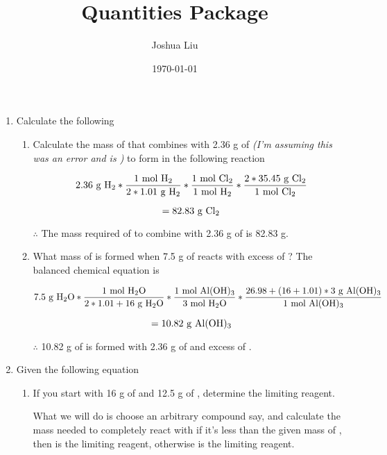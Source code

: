 \documentclass[10pt]{article}
\title{Quantities Package}
\author{Joshua Liu}
\date{\today}
\begin{document}
\maketitle

\begin{enumerate}
    \item Calculate the following
    \begin{enumerate}
        \item Calculate the mass of  that combines with 2.36 g of \sout{} \textit{(I'm assuming this was an error and is )} to form  in the following reaction
        

        \bigskip
        $$2.36\text{ g }\ce{H2}*\frac{1\text{ mol }\ce{H2}}{2*1.01\text{ g }\ce{H2}}*\frac{1\text{ mol }\ce{Cl2}}{1\text{ mol }\ce{H2}}*\frac{2*35.45\text{ g }\ce{Cl2}}{1\text{ mol }\ce{Cl2}}$$

        $$=82.83\text{ g }\ce{Cl2}$$

        $\therefore$ The mass required of  to combine with 2.36 g of  is 82.83 g.
        \bigskip
        \item What mass of  is formed when 7.5 g of  reacts with excess of ? The balanced chemical equation is
        
        \bigskip
        $$7.5\text{ g }\ce{H2O}*\frac{1\text{ mol }\ce{H2O}}{2*1.01+16\text{ g }\ce{H2O}}*\frac{1\text{ mol }\ce{Al(OH)3}}{3\text{ mol }\ce{H2O}}*\frac{26.98+(16+1.01)*3\text{ g }\ce{Al(OH)3}}{1\text{ mol }\ce{Al(OH)3}}$$

        $$=10.82\text{ g }\ce{Al(OH)3}$$

        $\therefore$ 10.82 g of  is formed with 2.36 g of  and excess of .
    \end{enumerate}
    \bigskip
    \item Given the following equation
    
    \begin{enumerate}
        \item If you start with 16 g of  and 12.5 g of , determine the limiting reagent.
        \medskip

        What we will do is choose an arbitrary compound say,  and calculate the mass needed to completely react with  if it's less than the given mass of , then  is the limiting reagent, otherwise  is the limiting reagent.
        \medskip


\end{enumerate}
\end{enumerate}
\end{document}
